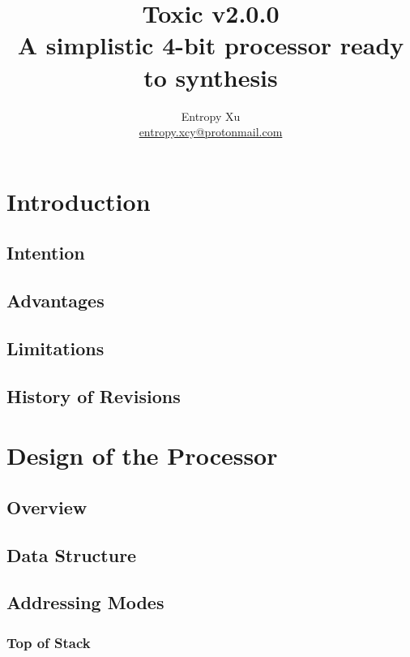 \documentclass[12pt]{report}
\begin{document}
\begin{titlepage}
    \thispagestyle{empty}
    \title{%
    Toxic v2.0.0 \\
    \large A simplistic 4-bit processor ready to synthesis}
    \author{Entropy Xu \\ 
            \href{mailto:entropy.xcy@protonmail.com}{entropy.xcy@protonmail.com} }
    \maketitle
    \end{titlepage}
    \tableofcontents

    \chapter{Introduction}
    \section{Intention}
    \section{Advantages}
    \section{Limitations}
    \section{History of Revisions}

    \chapter{Design of the Processor}
    \section{Overview}
    \section{Data Structure}

    \section{Addressing Modes}
    \subsection{Top of Stack}
\end{document}
